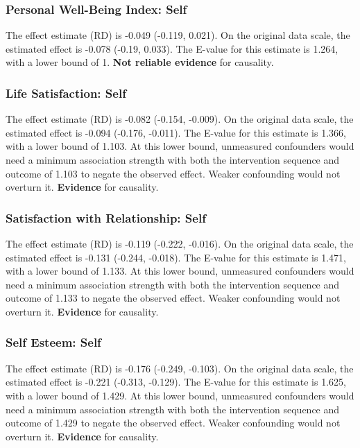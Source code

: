 \documentclass[
  singlecolumn]{article}
\begin{document}
\subsubsection{Personal Well-Being Index:
Self}\label{personal-well-being-index-self-12}

The effect estimate (RD) is -0.049 (-0.119, 0.021). On the original data
scale, the estimated effect is -0.078 (-0.19, 0.033). The E-value for
this estimate is 1.264, with a lower bound of 1. \textbf{Not reliable
evidence} for causality.

\subsubsection{Life Satisfaction: Self}\label{life-satisfaction-self-12}

The effect estimate (RD) is -0.082 (-0.154, -0.009). On the original
data scale, the estimated effect is -0.094 (-0.176, -0.011). The E-value
for this estimate is 1.366, with a lower bound of 1.103. At this lower
bound, unmeasured confounders would need a minimum association strength
with both the intervention sequence and outcome of 1.103 to negate the
observed effect. Weaker confounding would not overturn it.
\textbf{Evidence} for causality.

\subsubsection{Satisfaction with Relationship:
Self}\label{satisfaction-with-relationship-self-12}

The effect estimate (RD) is -0.119 (-0.222, -0.016). On the original
data scale, the estimated effect is -0.131 (-0.244, -0.018). The E-value
for this estimate is 1.471, with a lower bound of 1.133. At this lower
bound, unmeasured confounders would need a minimum association strength
with both the intervention sequence and outcome of 1.133 to negate the
observed effect. Weaker confounding would not overturn it.
\textbf{Evidence} for causality.

\subsubsection{Self Esteem: Self}\label{self-esteem-self-12}

The effect estimate (RD) is -0.176 (-0.249, -0.103). On the original
data scale, the estimated effect is -0.221 (-0.313, -0.129). The E-value
for this estimate is 1.625, with a lower bound of 1.429. At this lower
bound, unmeasured confounders would need a minimum association strength
with both the intervention sequence and outcome of 1.429 to negate the
observed effect. Weaker confounding would not overturn it.
\textbf{Evidence} for causality.
\end{document}
